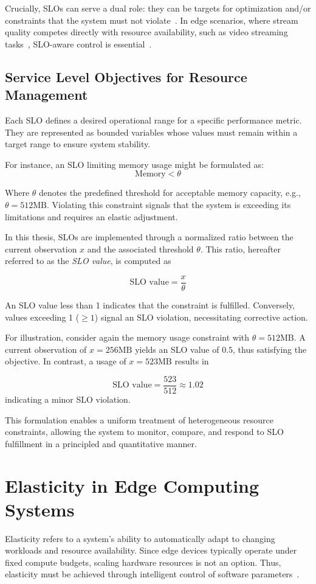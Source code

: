 Crucially, SLOs can serve a dual role: they can be targets for optimization and/or constraints that the
system must not violate~\cite{casamayor_pujol_deepslos_2024, sedlak_diffusing_2024}. In edge scenarios, where stream quality competes directly with resource availability, such as video streaming tasks~\cite{sedlak_adaptive_2024}, SLO-aware control is essential~\cite{sedlak_slo-aware_2025}.


\subsection{Service Level Objectives for Resource Management}

Each SLO defines a desired operational range for a specific performance metric. They are represented as bounded variables whose values must remain within a target range to ensure system stability.

For instance, an SLO limiting memory usage might be formulated as:
\[
\text{Memory} < \theta
\]

Where \(\theta\) denotes the predefined threshold for acceptable memory capacity, e.g., \(\theta = 512\text{MB}\). Violating this constraint signals that the system is exceeding its limitations and requires an elastic adjustment.

In this thesis, SLOs are implemented through a normalized ratio between the current observation $x$ and the associated threshold $\theta$. This ratio, hereafter referred to as the \textit{SLO value}, is computed as

\[
\text{SLO value} = \frac{x}{\theta}
\]

An SLO value less than 1 indicates that the constraint is fulfilled. Conversely, values exceeding 1 
(\(\geq1\)) signal an SLO violation, necessitating corrective action.

For illustration, consider again the memory usage constraint with \(\theta = 512\text{MB}\). A current observation of \(x = 256\text{MB}\) yields an SLO value of \(0.5\), thus satisfying the objective. In contrast, a usage of \(x = 523\text{MB}\) results in

\[
\text{SLO value} = \frac{523}{512} \approx 1.02
\]
indicating a minor SLO violation.

This formulation enables a uniform treatment of heterogeneous resource constraints, allowing the system to monitor, compare, and respond to SLO fulfillment in a principled and quantitative manner.

\section{Elasticity in Edge Computing Systems}
Elasticity refers to a system’s ability to automatically adapt to changing workloads and resource availability. Since edge devices typically operate under fixed compute budgets, scaling hardware resources is not an option. Thus, elasticity must be achieved through intelligent control of software parameters~\cite{sedlak_towards_2025}.

